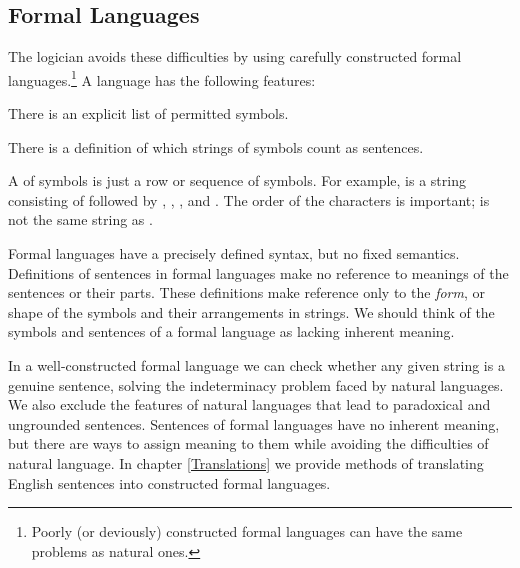 
\subsection{Formal Languages}\label{Formal Languages}
The logician avoids these difficulties by using carefully constructed formal languages.\footnote{Poorly (or deviously) constructed formal languages can have the same problems as natural ones.} 
A  language has the following features: 
\begin{cenumerate}
	\item\label{formal1} There is an explicit list of permitted symbols.
	\item\label{formal2} There is a definition of which strings of symbols count as sentences.   
\end{cenumerate} 
A  of symbols is just a row or sequence of symbols. 
For example,  is a string consisting of  followed by , , , and . The order of the characters is important;  is not the same string as . 

Formal languages have a precisely defined syntax, but no fixed semantics. 
Definitions of sentences in formal languages make no reference to meanings of the sentences or their parts. 
These definitions make reference only to the \emph{form}, or shape of the symbols and their arrangements in strings. 
We should think of the symbols and sentences of a formal language as lacking inherent meaning.

In a well-constructed formal language we can check whether any given string is a genuine sentence, solving the indeterminacy problem faced by natural languages.
We also exclude the features of natural languages that lead to paradoxical and ungrounded sentences. 
Sentences of formal languages have no inherent meaning, but there are ways to assign meaning to them while avoiding the difficulties of natural language. 
In chapter \ref{Translations} we provide methods of translating English sentences into constructed formal languages.

